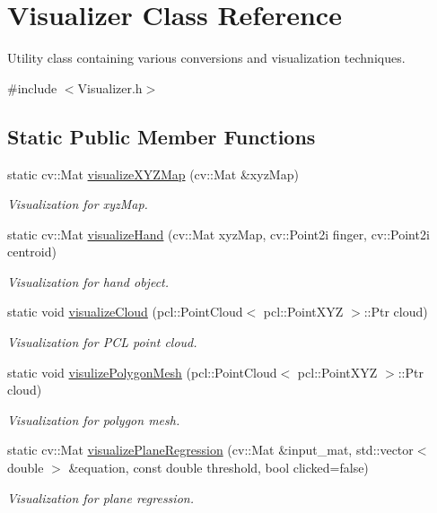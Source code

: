 \hypertarget{class_visualizer}{}\section{Visualizer Class Reference}
\label{class_visualizer}


Utility class containing various conversions and visualization techniques.  




{\ttfamily \#include $<$Visualizer.\+h$>$}

\subsection*{Static Public Member Functions}
\begin{DoxyCompactItemize}
\item 
static cv\+::\+Mat \hyperlink{class_visualizer_a24caf117be9878e2f5ad35cabb7f4f88}{visualize\+X\+Y\+Z\+Map} (cv\+::\+Mat \&xyz\+Map)
\begin{DoxyCompactList}\small\item\em Visualization for xyz\+Map. \end{DoxyCompactList}\item 
static cv\+::\+Mat \hyperlink{class_visualizer_aa4436945eb7f9220b55d46914e8c5005}{visualize\+Hand} (cv\+::\+Mat xyz\+Map, cv\+::\+Point2i finger, cv\+::\+Point2i centroid)
\begin{DoxyCompactList}\small\item\em Visualization for hand object. \end{DoxyCompactList}\item 
static void \hyperlink{class_visualizer_af65e36aaef7c1f60d0f79819f17707d7}{visualize\+Cloud} (pcl\+::\+Point\+Cloud$<$ pcl\+::\+Point\+X\+YZ $>$\+::Ptr cloud)
\begin{DoxyCompactList}\small\item\em Visualization for P\+CL point cloud. \end{DoxyCompactList}\item 
static void \hyperlink{class_visualizer_a82702715f2ac30e555ccad3339375bf8}{visulize\+Polygon\+Mesh} (pcl\+::\+Point\+Cloud$<$ pcl\+::\+Point\+X\+YZ $>$\+::Ptr cloud)
\begin{DoxyCompactList}\small\item\em Visualization for polygon mesh. \end{DoxyCompactList}\item 
static cv\+::\+Mat \hyperlink{class_visualizer_a448063633391ee4ae2af595fe760aab0}{visualize\+Plane\+Regression} (cv\+::\+Mat \&input\+\_\+mat, std\+::vector$<$ double $>$ \&equation, const double threshold, bool clicked=false)
\begin{DoxyCompactList}\small\item\em Visualization for plane regression. \end{DoxyCompactList}\end{DoxyCompactItemize}
